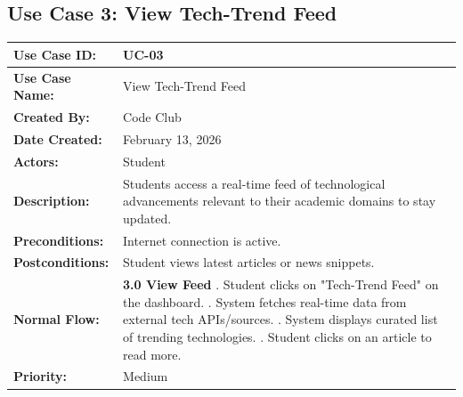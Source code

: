 \documentclass[12pt,a4paper]{article}
\begin{document}
\subsection*{Use Case 3: View Tech-Trend Feed}
\begin{longtable}{|p{4cm}|p{11cm}|}
\hline
\textbf{Use Case ID:} & UC-03 \\
\hline
\textbf{Use Case Name:} & View Tech-Trend Feed \\
\hline
\textbf{Created By:} & Code Club \\
\textbf{Date Created:} &February 13, 2026 \\
\hline
\textbf{Actors:} & Student \\
\hline
 \textbf{Description:} & Students access a real-time feed of technological advancements relevant to their academic domains to stay updated. \\
\hline
\textbf{Preconditions:} & Internet connection is active. \\
\hline
\textbf{Postconditions:} & Student views latest articles or news snippets. \\
\hline
\textbf{Normal Flow:} & 
\textbf{3.0 View Feed} \newline
1. Student clicks on "Tech-Trend Feed" on the dashboard. \newline
2. System fetches real-time data from external tech APIs/sources. \newline
3. System displays curated list of trending technologies. \newline
4. Student clicks on an article to read more. \\
\hline
 \textbf{Priority:} & Medium  \\
\hline
\end{longtable}
\newpage

\end{document}
